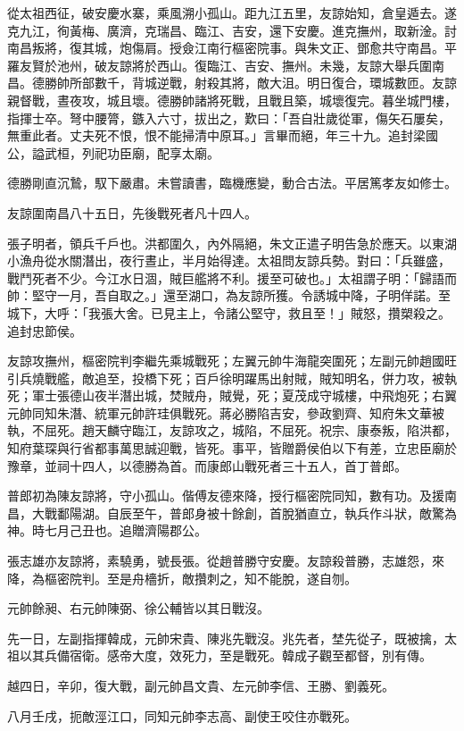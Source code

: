\begin{pinyinscope}
從太祖西征，破安慶水寨，乘風溯小孤山。距九江五里，友諒始知，倉皇遁去。遂克九江，徇黃梅、廣濟，克瑞昌、臨江、吉安，還下安慶。進克撫州，取新淦。討南昌叛將，復其城，炮傷肩。授僉江南行樞密院事。與朱文正、鄧愈共守南昌。平羅友賢於池州，破友諒將於西山。復臨江、吉安、撫州。未幾，友諒大舉兵圍南昌。德勝帥所部數千，背城逆戰，射殺其將，敵大沮。明日復合，環城數匝。友諒親督戰，晝夜攻，城且壞。德勝帥諸將死戰，且戰且築，城壞復完。暮坐城門樓，指揮士卒。弩中腰膂，鏃入六寸，拔出之，歎曰：「吾自壯歲從軍，傷矢石屢矣，無重此者。丈夫死不恨，恨不能掃清中原耳。」言畢而絕，年三十九。追封梁國公，謚武桓，列祀功臣廟，配享太廟。

德勝剛直沉鷙，馭下嚴肅。未嘗讀書，臨機應變，動合古法。平居篤孝友如修士。

友諒圍南昌八十五日，先後戰死者凡十四人。

張子明者，領兵千戶也。洪都圍久，內外隔絕，朱文正遣子明告急於應天。以東湖小漁舟從水關潛出，夜行晝止，半月始得達。太祖問友諒兵勢。對曰：「兵雖盛，戰鬥死者不少。今江水日涸，賊巨艦將不利。援至可破也。」太祖謂子明：「歸語而帥：堅守一月，吾自取之。」還至湖口，為友諒所獲。令誘城中降，子明佯諾。至城下，大呼：「我張大舍。已見主上，令諸公堅守，救且至！」賊怒，攢槊殺之。追封忠節侯。

友諒攻撫州，樞密院判李繼先乘城戰死；左翼元帥牛海龍突圍死；左副元帥趙國旺引兵燒戰艦，敵追至，投橋下死；百戶徐明躍馬出射賊，賊知明名，併力攻，被執死；軍士張德山夜半潛出城，焚賊舟，賊覺，死；夏茂成守城樓，中飛炮死；右翼元帥同知朱潛、統軍元帥許珪俱戰死。蔣必勝陷吉安，參政劉齊、知府朱文華被執，不屈死。趙天麟守臨江，友諒攻之，城陷，不屈死。祝宗、康泰叛，陷洪都，知府葉琛與行省都事萬思誠迎戰，皆死。事平，皆贈爵侯伯以下有差，立忠臣廟於豫章，並祠十四人，以德勝為首。而康郎山戰死者三十五人，首丁普郎。

普郎初為陳友諒將，守小孤山。偕傅友德來降，授行樞密院同知，數有功。及援南昌，大戰鄱陽湖。自辰至午，普郎身被十餘創，首脫猶直立，執兵作斗狀，敵驚為神。時七月己丑也。追贈濟陽郡公。

張志雄亦友諒將，素驍勇，號長張。從趙普勝守安慶。友諒殺普勝，志雄怨，來降，為樞密院判。至是舟檣折，敵攢刺之，知不能脫，遂自刎。

元帥餘昶、右元帥陳弼、徐公輔皆以其日戰沒。

先一日，左副指揮韓成，元帥宋貴、陳兆先戰沒。兆先者，埜先從子，既被擒，太祖以其兵備宿衛。感帝大度，效死力，至是戰死。韓成子觀至都督，別有傳。

越四日，辛卯，復大戰，副元帥昌文貴、左元帥李信、王勝、劉義死。

八月壬戌，扼敵涇江口，同知元帥李志高、副使王咬住亦戰死。


\end{pinyinscope}
